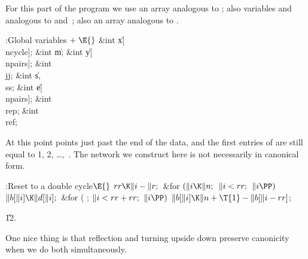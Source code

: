 For this part of the program we use an array 
analogous to ; also
variables  and  analogous to  and~; also
an array  analogous
to .

\Y\B\4:Global variables\X${}\mathrel+\E{}$\6
\&{int} \|x[\\{ncycle}];\6
\&{int} \|m;\6
\&{int} \|y[\\{npairs}];\6
\&{int} \\{jj};\6
\&{int} \|s${},{}$ \\{ss};\6
\&{int} \|e[\\{npairs}];\6
\&{int} \\{rep};\6
\&{int} \\{ref};\par
\fi

At this point  points just past the end of
the  data, and
the first  entries of  are still equal to 1, 2, \dots,~.
The network we construct here is not necessarily in canonical form.

\Y\B\4:Reset  to a double cycle\X${}\E{}$\6
$\\{rr}\K\|i-\|r;{}$\6
\&{for} ${}(\|i\K\|n;{}$ ${}\|i<\\{rr};{}$ ${}\|i\PP){}$\1\5
${}\|b[\|i]\K\|d[\|i];{}$\2\6
\&{for} ( ; ${}\|i<\\{rr}+\\{rr};{}$ ${}\|i\PP){}$\1\5
${}\|b[\|i]\K\|n+\T{1}-\|b[\|i-\\{rr}]{}$;\2\par
\U12.\fi

One nice thing is that reflection and turning upside down
preserve
canonicity when we do both simultaneously.

